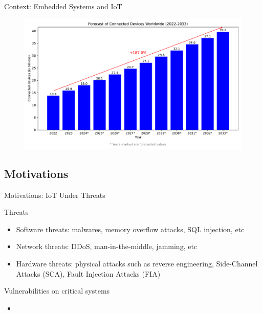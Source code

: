 \begin{frame}{Context: Embedded Systems and IoT}
\begin{minipage}[c]{0.5\textwidth}
\begin{figure}
		\end{figure}
        \vspace{-5pt}
        \begin{figure}
            \centering
            \includegraphics[width=.825\textwidth]{src/1_introduction/img/iot_forecasts.pdf}
            \label{fig:nbr_iot}
        \end{figure}
	\end{minipage}
\end{frame}

\subsection{Motivations}
\begin{frame}{Motivations: IoT Under Threats}
    \begin{block}{Threats}
        \begin{itemize}
            [square]
            \justifying
            \item Software threats: malwares, memory overflow attacks, SQL injection, etc
            \item Network threats: DDoS, man-in-the-middle, jamming, etc
            \item Hardware threats: physical attacks such as reverse engineering, Side-Channel Attacks (SCA), Fault Injection Attacks (FIA)
        \end{itemize}
    \end{block}

    \begin{block}{Vulnerabilities on critical systems}
        \begin{itemize}
            [square]
            \justifying
            \item 
        \end{itemize}
    \end{block}
\end{frame}
